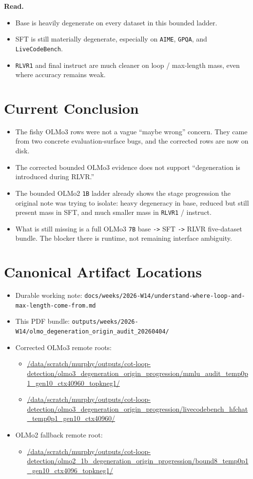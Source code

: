 \documentclass[11pt]{article}
\begin{document}
\textbf{Read.}
\begin{itemize}[leftmargin=1.5em]
\item Base is heavily degenerate on every dataset in this bounded ladder.
\item SFT is still materially degenerate, especially on \texttt{AIME}, \texttt{GPQA}, and \texttt{LiveCodeBench}.
\item \texttt{RLVR1} and final instruct are much cleaner on loop / max-length mass, even where accuracy remains weak.
\end{itemize}

\section*{Current Conclusion}
\begin{itemize}[leftmargin=1.5em]
\item The fishy OLMo3 rows were not a vague ``maybe wrong'' concern. They came from two concrete evaluation-surface bugs, and the corrected rows are now on disk.
\item The corrected bounded OLMo3 evidence does not support ``degeneration is introduced during RLVR.''
\item The bounded OLMo2 \texttt{1B} ladder already shows the stage progression the original note was trying to isolate: heavy degeneracy in base, reduced but still present mass in SFT, and much smaller mass in \texttt{RLVR1} / instruct.
\item What is still missing is a full OLMo3 \texttt{7B} base \texttt{->} SFT \texttt{->} RLVR five-dataset bundle. The blocker there is runtime, not remaining interface ambiguity.
\end{itemize}

\section*{Canonical Artifact Locations}
\begin{itemize}[leftmargin=1.5em]
\item Durable working note: \texttt{docs/weeks/2026-W14/understand-where-loop-and-max-length-come-from.md}
\item This PDF bundle: \texttt{outputs/weeks/2026-W14/olmo\_degeneration\_origin\_audit\_20260404/}
\item Corrected OLMo3 remote roots:
  \begin{itemize}[leftmargin=1.5em]
  \item \url{/data/scratch/murphy/outputs/cot-loop-detection/olmo3_degeneration_origin_progression/mmlu_audit_temp0p1_gen10_ctx40960_topkneg1/}
  \item \url{/data/scratch/murphy/outputs/cot-loop-detection/olmo3_degeneration_origin_progression/livecodebench_hfchat_temp0p1_gen10_ctx40960/}
  \end{itemize}
\item OLMo2 fallback remote root:
  \begin{itemize}[leftmargin=1.5em]
  \item \url{/data/scratch/murphy/outputs/cot-loop-detection/olmo2_1b_degeneration_origin_progression/bound8_temp0p1_gen10_ctx4096_topkneg1/}
  \end{itemize}
\end{itemize}
\end{document}
